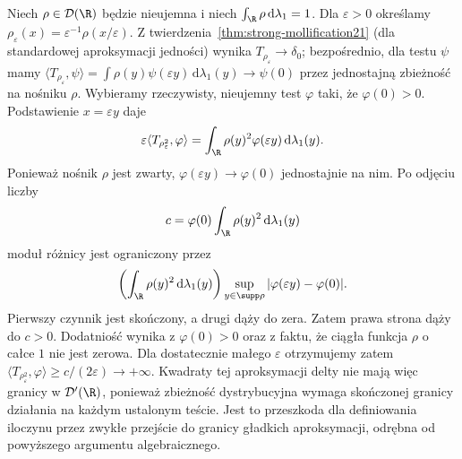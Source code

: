 \begin{przyklad}
\label{ex:dt-delta-square}
Niech $\rho\in\mathcal D(\R)$ będzie nieujemna
i niech $\int_\R\rho\,\mathrm d\lambda_1=1$.
Dla $\varepsilon>0$ określamy
$\rho_\varepsilon(x)=\varepsilon^{-1}\rho(x/\varepsilon)$.
Z twierdzenia~\ref{thm:strong-mollification21}
(dla standardowej aproksymacji jedności) wynika
$T_{\rho_\varepsilon}\to\delta_0$; bezpośrednio,
dla testu $\psi$ mamy
$\langle T_{\rho_\varepsilon},\psi\rangle=
\int\rho(y)\psi(\varepsilon y)\,\mathrm d\lambda_1(y)
\to\psi(0)$ przez jednostajną zbieżność na nośniku $\rho$.
Wybieramy rzeczywisty, nieujemny test $\varphi$
taki, że $\varphi(0)>0$.
Podstawienie $x=\varepsilon y$ daje
\[
 \varepsilon\langle T_{\rho_\varepsilon^2},\varphi\rangle
 =\int_\R \rho(y)^2\varphi(\varepsilon y)\,
 \mathrm d\lambda_1(y).
\]
Ponieważ nośnik $\rho$ jest zwarty,
$\varphi(\varepsilon y)\to\varphi(0)$ jednostajnie
na nim. Po odjęciu liczby
\[
 c=\varphi(0)\int_\R\rho(y)^2\,\mathrm d\lambda_1(y)
\]
moduł różnicy jest ograniczony przez
\[
 \left(\int_\R\rho(y)^2\,\mathrm d\lambda_1(y)\right)
 \sup_{y\in\supp\rho}|\varphi(\varepsilon y)-\varphi(0)|.
\]
Pierwszy czynnik jest skończony, a drugi dąży
do zera. Zatem prawa strona dąży do $c>0$.
Dodatniość wynika z $\varphi(0)>0$ oraz z faktu,
że ciągła funkcja $\rho$ o całce $1$ nie jest zerowa.
Dla dostatecznie małego $\varepsilon$ otrzymujemy
zatem
$\langle T_{\rho_\varepsilon^2},\varphi\rangle
\ge c/(2\varepsilon)\to+\infty$.
Kwadraty tej aproksymacji delty nie mają więc
granicy w $\mathcal D'(\R)$, ponieważ zbieżność
dystrybucyjna wymaga skończonej granicy działania
na każdym ustalonym teście.
Jest to przeszkoda dla definiowania iloczynu
przez zwykłe przejście do granicy gładkich
aproksymacji, odrębna od powyższego argumentu
algebraicznego.
\end{przyklad}
